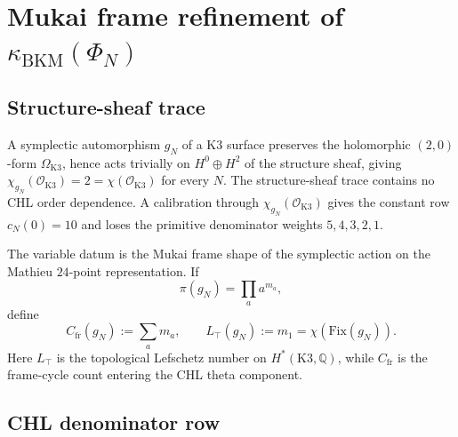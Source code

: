 \providecommand{\BKM}{\mathrm{BKM}}
\providecommand{\ch}{\mathrm{ch}}
\providecommand{\cat}{\mathrm{cat}}
\providecommand{\fib}{\mathrm{fiber}}
\providecommand{\cO}{\mathcal{O}}
\providecommand{\K}{\mathrm{K3}}
\providecommand{\Fix}{\mathrm{Fix}}
\providecommand{\symp}{\mathrm{symp}}
\providecommand{\fr}{\mathrm{fr}}
\providecommand{\CHL}{\mathrm{CHL}}
\providecommand{\GC}{\mathrm{GC}}
\providecommand{\dd}{\mathrm{dd}}
\providecommand{\wt}{\operatorname{wt}}

\section*{Mukai frame refinement of $\kappa_{\BKM}(\Phi_N)$}

\subsection*{Structure-sheaf trace}

A symplectic automorphism $g_N$ of a K3
surface preserves the holomorphic $(2,0)$-form $\Omega_{\K}$, hence acts
trivially on $H^0 \oplus H^2$ of the structure sheaf, giving
$\chi_{g_N}(\cO_{\K}) = 2 = \chi(\cO_{\K})$ for every
$N$. The structure-sheaf trace contains no CHL order dependence. A
calibration through $\chi_{g_N}(\cO_{\K})$ gives the constant row
$c_N(0)=10$ and loses the primitive denominator weights
$5,4,3,2,1$.

The variable datum is the Mukai frame shape of the symplectic action on
the Mathieu $24$-point representation.  If
\[
  \pi(g_N)=\prod_a a^{m_a},
\]
define
\[
  C_{\fr}(g_N):=\sum_a m_a,\qquad
  L_{\top}(g_N):=m_1=\chi(\Fix(g_N)).
\]
Here $L_{\top}$ is the topological Lefschetz number on
$H^*(\K,\mathbb{Q})$, while $C_{\fr}$ is the frame-cycle count entering
the CHL theta component.

\subsection*{CHL denominator row}

